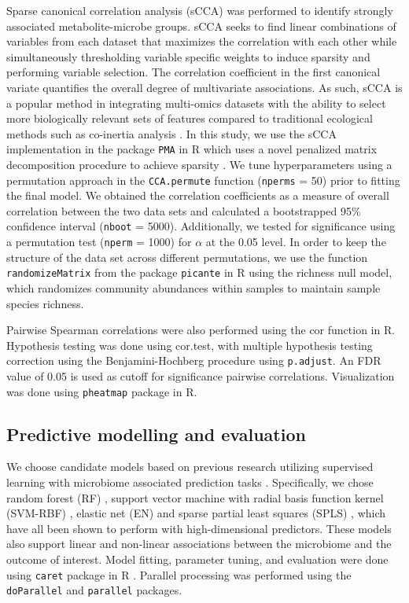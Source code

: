 Sparse canonical correlation analysis (sCCA) was performed to identify strongly associated metabolite-microbe groups. sCCA seeks to find linear combinations of variables from each dataset that maximizes the correlation with each other while simultaneously thresholding variable specific weights to induce sparsity and performing variable selection. The correlation coefficient in the first canonical variate quantifies the overall degree of multivariate associations. As such, sCCA is a popular method in integrating multi-omics datasets with the ability to select more biologically relevant sets of features compared to traditional ecological methods such as co-inertia analysis \cite{cao2015sparse}. In this study, we use the sCCA implementation in the package \texttt{PMA} in R \cite{witten2019pma} which uses a novel penalized matrix decomposition procedure to achieve sparsity \cite{witten2009penalized}. We tune hyperparameters using a permutation approach in the \texttt{CCA.permute} function (\texttt{nperms} = 50) prior to fitting the final model. We obtained the correlation coefficients as a measure of overall correlation between the two data sets and calculated a bootstrapped 95\% confidence interval (\texttt{nboot} = 5000). Additionally, we tested for significance using a permutation test (\texttt{nperm} = 1000) for $\alpha$ at the 0.05 level. In order to keep the structure of the data set across different permutations, we use the function \texttt{randomizeMatrix} from the package \texttt{picante} in R \cite{kembel2010picante} using the richness null model, which randomizes community abundances within samples to maintain sample species richness.  

Pairwise Spearman correlations were also performed using the cor function in R. Hypothesis testing was done using cor.test, with multiple hypothesis testing correction using the Benjamini-Hochberg procedure \cite{benjamini1995controlling} using \texttt{p.adjust}. An FDR value of 0.05 is used as cutoff for significance pairwise correlations. Visualization was done using \texttt{pheatmap} package in R.  

\subsection{Predictive modelling and evaluation}

We choose candidate models based on previous research utilizing supervised learning with microbiome associated prediction tasks \cite{zhou2019review, pasolli2016machine, mallick2019predictive}. Specifically, we chose random forest (RF) \cite{breiman2001random}, support vector machine with radial basis function kernel (SVM-RBF) \cite{boser1992training}, elastic net (EN) \cite{zou2005regularization} and sparse partial least squares (SPLS) \cite{chun2010sparse}, which have all been shown to perform with high-dimensional predictors. These models also support linear and non-linear associations between the microbiome and the outcome of interest. Model fitting, parameter tuning, and evaluation were done using \texttt{caret} package in R \cite{wing2019caret}. Parallel processing was performed using the \texttt{doParallel} \cite{corporation2019doparallel} and \texttt{parallel} packages. 

